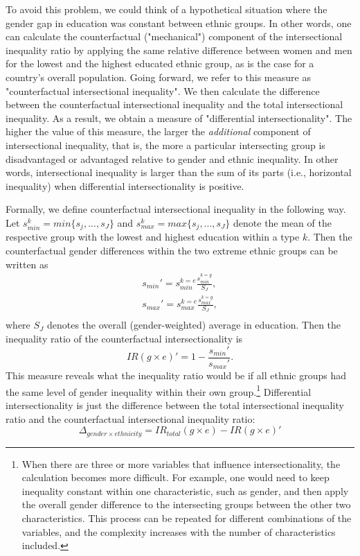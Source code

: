 To avoid this problem, we could think of a hypothetical situation where the gender gap in education was constant between ethnic groups. In other words, one can calculate the counterfactual ("mechanical") component of the intersectional inequality ratio by applying the same relative difference between women and men for the lowest and the highest educated ethnic group, as is the case for a country's overall population. Going forward, we refer to this measure as "counterfactual intersectional inequality". We then calculate the difference between the counterfactual intersectional inequality and the total intersectional inequality. As a result, we obtain a measure of "differential intersectionality". The higher the value of this measure, the larger the \textit{additional} component of intersectional inequality, that is, the more a particular intersecting group is disadvantaged or advantaged relative to gender and ethnic inequality. In other words, intersectional inequality is larger than the sum of its parts (i.e., horizontal inequality) when differential intersectionality is positive. 

Formally, we define counterfactual intersectional inequality in the following way. Let $s_{min}^k = min\{s_j, ..., s_J\}$ and $s_{max}^k = max\{s_j, ..., s_J\}$ denote the mean of the respective group with the lowest and highest education within a type $k$. Then the counterfactual gender differences within the two extreme ethnic groups can be written as 
\begin{equation}
\begin{aligned}
    s_{min}' =  s_{min}^{k=e} \frac{s_{min}^{k=g}}{S_J} ,\\
s_{max}' =  s_{max}^{k=e} \frac{s_{max}^{k=g}}{S_J} ,\\
\end{aligned}
\end{equation}
where $S_J$ denotes the overall (gender-weighted) average in education. Then the inequality ratio of the counterfactual intersectionality is 
\begin{equation}
   IR(g \times e)' = 1-\frac{s_{min}'}{s_{max}'}. 
\end{equation}
This measure reveals what the inequality ratio would be if all ethnic groups had the same level of gender inequality within their own group.\footnote{When there are three or more variables that influence intersectionality, the calculation becomes more difficult. For example, one would need to keep inequality constant within one characteristic, such as gender, and then apply the overall gender difference to the intersecting groups between the other two characteristics. This process can be repeated for different combinations of the variables, and the complexity increases with the number of characteristics included.} Differential intersectionality is just the difference between the total intersectional inequality ratio and the counterfactual intersectional inequality ratio:
\begin{equation}
    \Delta_{gender\times ethnicity} = IR_{total}(g \times e) - IR(g \times e)'
\end{equation}

